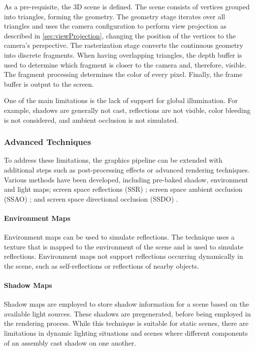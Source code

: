 As a pre-requisite, the 3D scene is defined. The scene consists of vertices grouped into triangles, forming the geometry. The geometry stage iterates over all triangles and uses the camera configuration to perform view projection as described in \autoref{sec:viewProjection}, changing the position of the vertices to the camera's perspective. The rasterization stage converts the continuous geometry into discrete fragments. When having overlapping triangles, the depth buffer is used to determine which fragment is closer to the camera and, therefore, visible. The fragment processing determines the color of every pixel. Finally, the frame buffer is output to the screen.

One of the main limitations is the lack of support for global illumination. For example, shadows are generally not cast, reflections are not visible, color bleeding is not considered, and ambient occlusion is not simulated.

\subsubsection{Advanced Techniques}

To address these limitations, the graphics pipeline can be extended with additional steps such as post-processing effects or advanced rendering techniques. Various methods have been developed, including pre-baked shadow, environment \cite{greene1986environment} and light maps; screen space reflections (SSR) \cite{screenSpaceReflectionsStackowiak}; screen space ambient occlusion (SSAO) \cite{bavoil2008ssao}; and screen space directional occlusion (SSDO) \cite{ritschel2009ssdo}.

\paragraph{Environment Maps}

Environment maps can be used to simulate reflections. The technique uses a texture that is mapped to the environment of the scene and is used to simulate reflections. Environment maps not support reflections occurring dynamically in the scene, such as self-reflections or reflections of nearby objects.

\paragraph{Shadow Maps}

Shadow maps are employed to store shadow information for a scene based on the available light sources. These shadows are pregenerated, before being employed in the rendering process. While this technique is suitable for static scenes, there are limitations in dynamic lighting situations and scenes where different components of an assembly cast shadow on one another.

